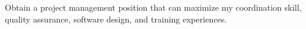 Obtain a project management position
that can maximize my coordination skill,
     quality assurance,
     software design,
     and training experiences.
